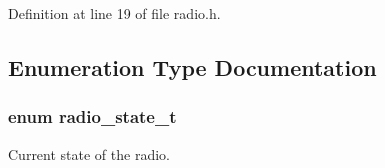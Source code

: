 Definition at line 19 of file radio.\+h.



\subsection{Enumeration Type Documentation}
\subsubsection[{\texorpdfstring{radio\+\_\+state\+\_\+t}{radio_state_t}}]{\setlength{\rightskip}{0pt plus 5cm}enum {\bf radio\+\_\+state\+\_\+t}}\hypertarget{group__radio_ga756adac824be7fdeeac3026997c04711}{}\label{group__radio_ga756adac824be7fdeeac3026997c04711}


Current state of the radio. 

